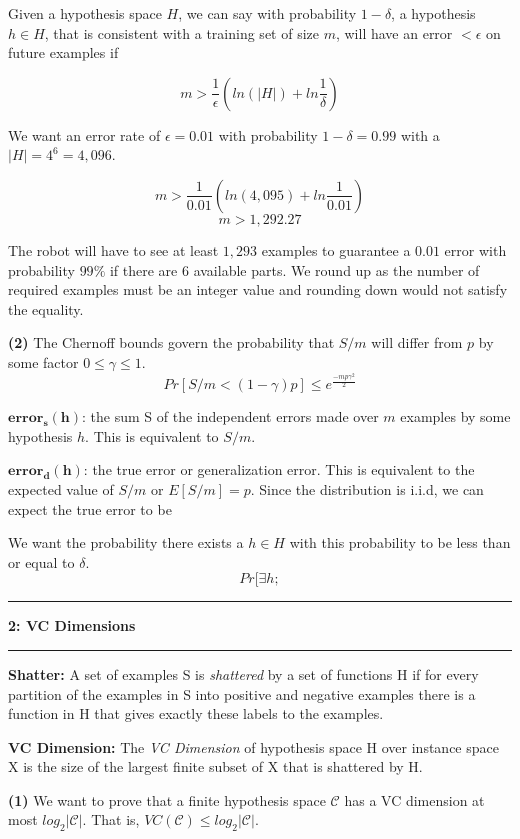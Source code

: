 \documentclass[11pt]{article}
\newcommand\question[2]{\vspace{.25in}\hrule\textbf{#1: #2}\vspace{.5em}\hrule\vspace{.10in}}
\renewcommand\part[1]{\vspace{.10in}\textbf{(#1)}}
\begin{document}
Given a hypothesis space $H$, we can say with probability $1 - \delta$, a hypothesis $h \in H$, that is consistent with a training set of size $m$, will have an error $< \epsilon$ on future examples if

$$m > \frac{1}{\epsilon}(ln(|H|) + ln\frac{1}{\delta})$$

We want an error rate of $\epsilon = 0.01$ with probability $1 - \delta = 0.99$ with a $|H| = 4^6 = 4,096$.

$$m > \frac{1}{0.01}(ln(4,095) + ln\frac{1}{0.01})$$
$$m > 1,292.27$$

The robot will have to see at least $1,293$ examples to guarantee a $0.01$ error with probability $99\%$ if there are 6 available parts. We round up as the number of required examples must be an integer value and rounding down would not satisfy the equality.

\newpage
\part{2} The Chernoff bounds govern the probability that $S/m$ will differ from $p$ by some factor $0 \leq \gamma \leq 1$.
	$$Pr[S/m < (1 - \gamma)p] \leq e^\frac{-mp\gamma^2}{2}$$	
	
$\mathbf{error_s(h)}$: the sum S of the independent errors made over $m$ examples by some hypothesis $h$. This is equivalent to $S/m$.

$\mathbf{error_d(h)}$: the true error or generalization error. This is equivalent to the expected value of $S/m$ or $E[S/m] = p$. Since the distribution is i.i.d, we can expect the true error to be
	
We want the probability there exists a $h \in H$ with this probability to be less than or equal to $\delta$.
$$Pr[\exists h;$$

\question{2}{VC Dimensions}
\textbf{Shatter:} A set of examples S is \textit{shattered} by a set of functions H if for every partition of the examples in S into positive and negative examples there is a function in H that gives exactly these labels to the examples.

\textbf{VC Dimension:} The \textit{VC Dimension} of hypothesis space H over instance space X is the size of the largest finite subset of X that is shattered by H.

\part{1} We want to prove that a finite hypothesis space $\mathcal{C}$ has a VC dimension at most $log_2|\mathcal{C}|$. That is, $VC(\mathcal{C}) \leq log_2|\mathcal{C}|$.
\end{document}

